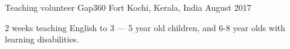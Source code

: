 \begin{cventries}
  \cventry
    {Teaching volunteer} %
    {Gap360} %
    {Fort Kochi, Kerala, India} %
    {August 2017} %
    {
      \begin{cvitems} %
        \item {2 weeks teaching English to 3 --- 5 year old children, and 6-8 year olds with learning disabilities.}
      \end{cvitems}
    }
    
\end{cventries}
